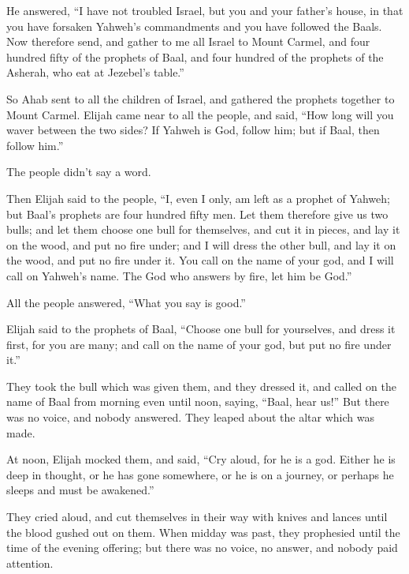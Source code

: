  He answered, ``I have not troubled Israel, but you and
your father's house, in that you have forsaken Yahweh's commandments and
you have followed the Baals.  Now therefore send, and
gather to me all Israel to Mount Carmel, and four hundred fifty of the
prophets of Baal, and four hundred of the prophets of the Asherah, who
eat at Jezebel's table.''

 So Ahab sent to all the children of Israel, and gathered
the prophets together to Mount Carmel.  Elijah came near to
all the people, and said, ``How long will you waver between the two
sides? If Yahweh is God, follow him; but if Baal, then follow him.''

The people didn't say a word.

 Then Elijah said to the people, ``I, even I only, am left
as a prophet of Yahweh; but Baal's prophets are four hundred fifty men.
 Let them therefore give us two bulls; and let them choose
one bull for themselves, and cut it in pieces, and lay it on the wood,
and put no fire under; and I will dress the other bull, and lay it on
the wood, and put no fire under it.  You call on the name
of your god, and I will call on Yahweh's name. The God who answers by
fire, let him be God.''

All the people answered, ``What you say is good.''

 Elijah said to the prophets of Baal, ``Choose one bull for
yourselves, and dress it first, for you are many; and call on the name
of your god, but put no fire under it.''

 They took the bull which was given them, and they dressed
it, and called on the name of Baal from morning even until noon, saying,
``Baal, hear us!'' But there was no voice, and nobody answered. They
leaped about the altar which was made.

 At noon, Elijah mocked them, and said, ``Cry aloud, for he
is a god. Either he is deep in thought, or he has gone somewhere, or he
is on a journey, or perhaps he sleeps and must be awakened.''

 They cried aloud, and cut themselves in their way with
knives and lances until the blood gushed out on them.  When
midday was past, they prophesied until the time of the evening offering;
but there was no voice, no answer, and nobody paid attention.

